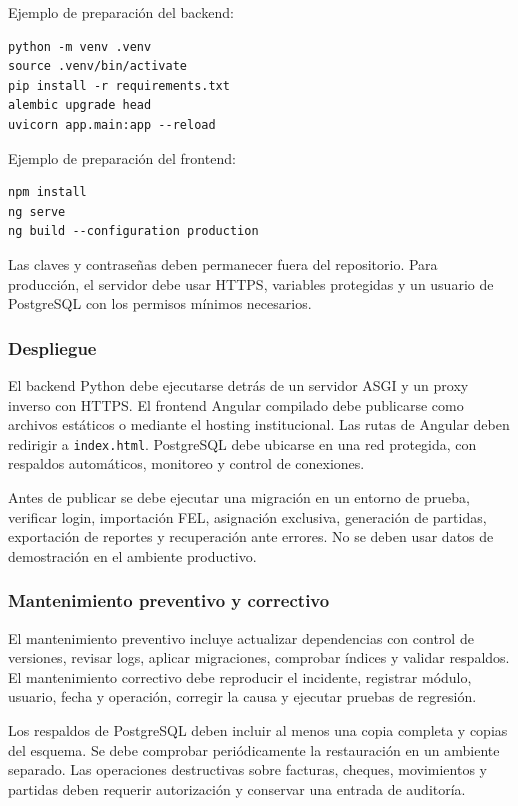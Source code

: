 Ejemplo de preparación del backend:

\begin{verbatim}
python -m venv .venv
source .venv/bin/activate
pip install -r requirements.txt
alembic upgrade head
uvicorn app.main:app --reload
\end{verbatim}

Ejemplo de preparación del frontend:

\begin{verbatim}
npm install
ng serve
ng build --configuration production
\end{verbatim}

Las claves y contraseñas deben permanecer fuera del repositorio. Para producción, el servidor debe usar HTTPS, variables protegidas y un usuario de PostgreSQL con los permisos mínimos necesarios.

\subsubsection{Despliegue}
El backend Python debe ejecutarse detrás de un servidor ASGI y un proxy inverso con HTTPS. El frontend Angular compilado debe publicarse como archivos estáticos o mediante el hosting institucional. Las rutas de Angular deben redirigir a \texttt{index.html}. PostgreSQL debe ubicarse en una red protegida, con respaldos automáticos, monitoreo y control de conexiones.

Antes de publicar se debe ejecutar una migración en un entorno de prueba, verificar login, importación FEL, asignación exclusiva, generación de partidas, exportación de reportes y recuperación ante errores. No se deben usar datos de demostración en el ambiente productivo.

\subsubsection{Mantenimiento preventivo y correctivo}
El mantenimiento preventivo incluye actualizar dependencias con control de versiones, revisar logs, aplicar migraciones, comprobar índices y validar respaldos. El mantenimiento correctivo debe reproducir el incidente, registrar módulo, usuario, fecha y operación, corregir la causa y ejecutar pruebas de regresión.

Los respaldos de PostgreSQL deben incluir al menos una copia completa y copias del esquema. Se debe comprobar periódicamente la restauración en un ambiente separado. Las operaciones destructivas sobre facturas, cheques, movimientos y partidas deben requerir autorización y conservar una entrada de auditoría.

